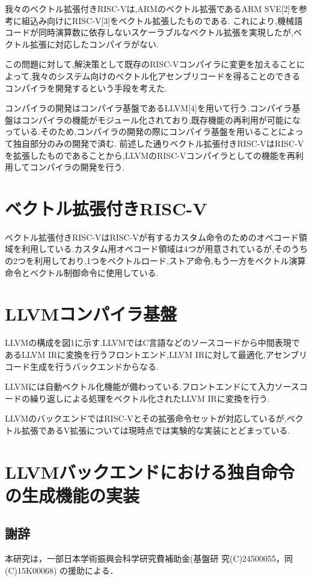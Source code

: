 \documentclass[a4paper,9pt, twocolumn]{jarticle}
\renewcommand{\baselinestretch}{0.87}   %
\begin{document}
我々のベクトル拡張付きRISC-Vは,ARMのベクトル拡張であるARM SVE[2]を参考に組込み向けにRISC-V[3]をベクトル拡張したものである.
これにより,機械語コードが同時演算数に依存しないスケーラブルなベクトル拡張を実現したが,ベクトル拡張に対応したコンパイラがない.

この問題に対して,解決策として既存のRISC-Vコンパイラに変更を加えることによって,我々のシステム向けのベクトル化アセンブリコードを得ることのできるコンパイラを開発するという手段を考えた.

コンパイラの開発はコンパイラ基盤であるLLVM[4]を用いて行う.コンパイラ基盤はコンパイラの機能がモジュール化されており,既存機能の再利用が可能になっている.そのため,コンパイラの開発の際にコンパイラ基盤を用いることによって独自部分のみの開発で済む.
前述した通りベクトル拡張付きRISC-VはRISC-Vを拡張したものであることから,LLVMのRISC-Vコンパイラとしての機能を再利用してコンパイラの開発を行う.


\section{ベクトル拡張付きRISC-V}
ベクトル拡張付きRISC-VはRISC-Vが有するカスタム命令のためのオペコード領域を利用している.カスタム用オペコード領域は4つが用意されているが,そのうちの2つを利用しており,1つをベクトルロード,ストア命令,もう一方をベクトル演算命令とベクトル制御命令に使用している.



\section{LLVMコンパイラ基盤}
LLVMの構成を図1に示す.LLVMではC言語などのソースコードから中間表現であるLLVM IRに変換を行うフロントエンド,LLVM IRに対して最適化,アセンブリコード生成を行うバックエンドからなる.

LLVMには自動ベクトル化機能が備わっている.フロントエンドにて入力ソースコードの繰り返しによる処理をベクトル化されたLLVM IRに変換を行う.

LLVMのバックエンドではRISC-Vとその拡張命令セットが対応しているが,ベクトル拡張であるV拡張については現時点では実験的な実装にとどまっている.

\section{LLVMバックエンドにおける独自命令の生成機能の実装}

\renewcommand{\baselinestretch}{0.83}\selectfont
\subsection*{\small 謝辞}
\vspace{-0.5mm}
{\small 本研究は，一部日本学術振興会科学研究費補助金(基盤研
究(C)24500055，同(C)15K00068) の援助による．}
\end{document}
